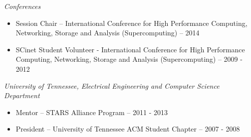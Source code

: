 {\sl Conferences}
\begin{itemize}
    \item Session Chair -- International Conference for High Performance
        Computing, Networking, Storage and Analysis (Supercomputing) -- 2014
    \item SCinet Student Volunteer - International Conference for High
        Performance Computing, Networking, Storage and Analysis
        (Supercomputing) -- 2009 - 2012
\end{itemize}

{\sl University of Tennessee, Electrical Engineering and Computer Science Department}
\begin{itemize}
    \item Mentor -- STARS Alliance Program -- 2011 - 2013
    \item President -- University of Tennessee ACM Student Chapter -- 2007 - 2008
\end{itemize}

